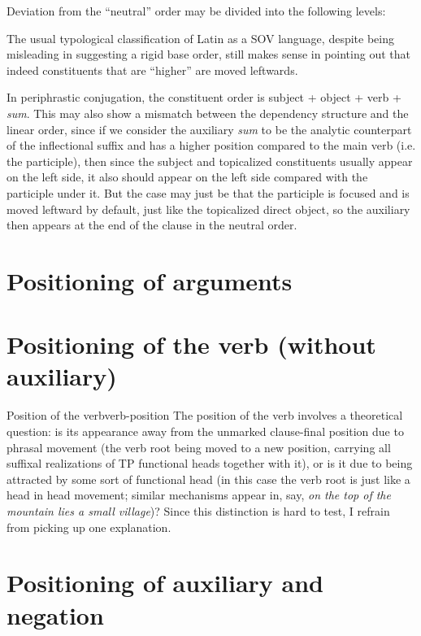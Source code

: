 \documentclass[a4paper, oneside, 12pt]{report}
\newcommand{\form}[1]{\emph{#1}}
\begin{document}
Deviation from the ``neutral'' order may be divided into the following levels:

The usual typological classification of Latin as a SOV language, 
despite being misleading in suggesting a rigid base order, 
still makes sense in pointing out that indeed constituents that are ``higher'' are moved leftwards.

In periphrastic conjugation,
the constituent order is subject + object + verb + \form{sum}.
This may also show a mismatch between the dependency structure and the linear order,
since if we consider the auxiliary \form{sum} to be 
the analytic counterpart of the inflectional suffix 
and has a higher position compared to the main verb (i.e. the participle),
then since the subject and topicalized constituents usually appear on the left side, 
it also should appear on the left side compared with the participle under it.
But the case may just be that the participle is focused and is moved leftward by default, 
just like the topicalized direct object,
so the auxiliary then appears at the end of the clause in the neutral order.

\section{Positioning of arguments}

\section{Positioning of the verb (without auxiliary)}

\begin{infobox}{Position of the verb}{verb-position}
    The position of the verb involves a theoretical question:
    is its appearance away from the unmarked clause-final position
    due to phrasal movement 
    (the verb root being moved to a new position, 
    carrying all suffixal realizations of 
    TP functional heads together with it),
    or is it due to being attracted by some sort of functional head
    (in this case the verb root is just like a head in head movement;
    similar mechanisms appear in, say, 
    \form{on the top of the mountain \emph{lies} a small village})?
    Since this distinction is hard to test, 
    I refrain from picking up one explanation.
\end{infobox}

\section{Positioning of auxiliary and negation}\label{sec:constituent-order.aux-neg}
\end{document}
